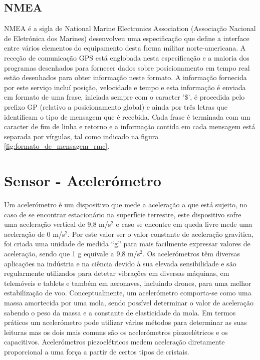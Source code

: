 \subsection{NMEA}
\label{sub:nmea}

NMEA é a sigla de National Marine Electronics Association (Associação Nacional de Eletrónica dos Marines) desenvolveu uma especificação que define a interface entre vários elementos do equipamento desta forma militar norte-americana.
A receção de comunicação GPS está englobada nesta especificação e a maioria dos programas desenhados para fornecer dados sobre posicionamento em tempo real estão desenhados para obter informação neste formato.
A informação fornecida por este serviço incluí posição, velocidade e tempo e esta informação é enviada em formato de uma frase, iniciada sempre com o caracter '\$', é procedida pelo prefixo GP (relativo a posicionamento global) e ainda por três letras que identificam o tipo de mensagem que é recebida.
Cada frase é terminada com um caracter de fim de linha e retorno e a informação contida em cada mensagem está separada por vírgulas, tal como indicado na figura \ref{fig:formato_de_mensagem_rmc}.

\section{Sensor - Acelerómetro}
\label{sec:acelerometro}

Um acelerómetro é um dispositivo que mede a aceleração a que está sujeito, no caso de se encontrar estacionário na superfície terrestre, este dispositivo sofre uma aceleração vertical de 9,8 m/s$^2$ e caso se encontre em queda livre mede uma aceleração de 0 m/s$^2$.
Por este valor ser o valor constante de aceleração gravítica, foi criada uma unidade de medida ``g'' para mais facilmente expressar valores de aceleração, sendo que 1 g equivale a 9,8 m/s$^2$.
Os acelerómetros têm diversas aplicações na indústria e na ciência devido à sua elevada sensibilidade e são regularmente utilizados para detetar vibrações em diversas máquinas, em telemóveis e tablets e também em aeronaves, incluindo drones, para uma melhor estabilização de voo.
Conceptualmente, um acelerómetro comporta-se como uma massa amortecida por uma mola, sendo possível determinar o valor de aceleração sabendo o peso da massa e a constante de elasticidade da mola.
Em termos práticos um acelerómetro pode utilizar vários métodos para determinar as suas leituras mas os dois mais comuns são os acelerómetros piezoelétricos e os capacitivos.
Acelerómetros piezoelétricos medem aceleração diretamente proporcional a uma força a partir de certos tipos de cristais.

